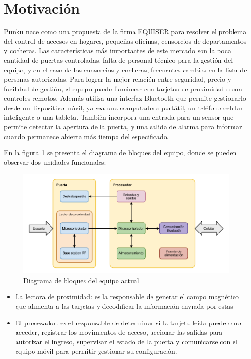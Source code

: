 \section{Motivación}
\label{sec:motivacion}

Punku nace como una propuesta de la firma EQUISER para resolver el problema del control de accesos en hogares, pequeñas oficinas, consorcios de departamentos y cocheras. Las características más importantes de este mercado son la poca cantidad de puertas controladas, falta de personal técnico para la gestión del equipo, y en el caso de los consorcios y cocheras, frecuentes cambios en la lista de personas autorizadas. Para lograr la mejor relación entre seguridad, precio y facilidad de gestión, el equipo puede funcionar con tarjetas de proximidad o con controles remotos. Además utiliza una interfaz Bluetooth que permite gestionarlo desde un dispositivo móvil, ya sea una computadora portátil, un teléfono celular inteligente o una tableta. También incorpora una entrada para un sensor que permite detectar la apertura de la puerta, y una salida de alarma para informar cuando permanece abierta más tiempo del especificado. 

En la figura \ref{fig:BloquesActual} se presenta el diagrama de bloques del equipo, donde se pueden observar dos unidades funcionales:

\begin{figure}[ht]
	\centering
	\includegraphics[width=\textwidth]{./Figures/BloquesActual.pdf}
	\caption{Diagrama de bloques del equipo actual}
	\label{fig:BloquesActual}
\end{figure}

\begin{itemize}
	\item La lectora de proximidad: es la responsable de generar el campo magnético que alimenta a las tarjetas y decodificar la información enviada por estas.
	\item El procesador: es el responsable de determinar si la tarjeta leída puede o no acceder, registrar los movimientos de acceso, accionar las salidas para autorizar el ingreso, supervisar el estado de la puerta y comunicarse con el equipo móvil para permitir gestionar su configuración.
\end{itemize}


